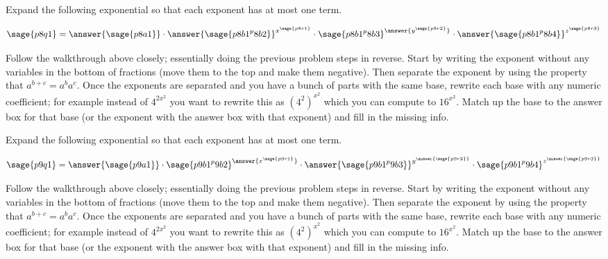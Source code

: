 \documentclass{ximera}
\begin{document}
\begin{problem}
    Expand the following exponential so that each exponent has at most one term.
    
    \[
        \sage{p8q1} 
            = \answer{\sage{p8a1}} \cdot {\answer{\sage{p8b1^p8b2}}}^{{x^{\sage{p8r1}}}} \cdot  {\sage{p8b1^p8b3}}^{\answer{y^{\sage{p8r2}}}} \cdot {\answer{\sage{p8b1^p8b4}}}^{{z^{\sage{p8r3}}}}
    \]
    \begin{feedback}
        Follow the walkthrough above closely; essentially doing the previous problem steps in reverse. Start by writing the exponent without any variables in the bottom of fractions (move them to the top and make them negative). Then separate the exponent by using the property that $a^{b+c} = a^ba^c$. Once the exponents are separated and you have a bunch of parts with the same base, rewrite each base with any numeric coefficient; for example instead of $4^{2x^2}$ you want to rewrite this as $\left(4^2\right)^{x^2}$ which you can compute to $16^{x^2}$. Match up the base to the answer box for that base (or the exponent with the answer box with that exponent) and fill in the missing info.
    \end{feedback}
\end{problem}

\begin{problem}
    Expand the following exponential so that each exponent has at most one term.
    
    \[
        \sage{p9q1} 
            = \answer{\sage{p9a1}} \cdot {\sage{p9b1^p9b2}}^{\answer{x^{\sage{p9r1}}}} \cdot  \answer{\sage{p9b1^p9b3}}^{y^{\answer{\sage{p9r2}}}} \cdot {\sage{p9b1^p9b4}}^{z^{\answer{\sage{p9r3}}}}
    \]
    \begin{feedback}
        Follow the walkthrough above closely; essentially doing the previous problem steps in reverse. Start by writing the exponent without any variables in the bottom of fractions (move them to the top and make them negative). Then separate the exponent by using the property that $a^{b+c} = a^ba^c$. Once the exponents are separated and you have a bunch of parts with the same base, rewrite each base with any numeric coefficient; for example instead of $4^{2x^2}$ you want to rewrite this as $\left(4^2\right)^{x^2}$ which you can compute to $16^{x^2}$. Match up the base to the answer box for that base (or the exponent with the answer box with that exponent) and fill in the missing info.
    \end{feedback}
\end{problem}
\end{document}
